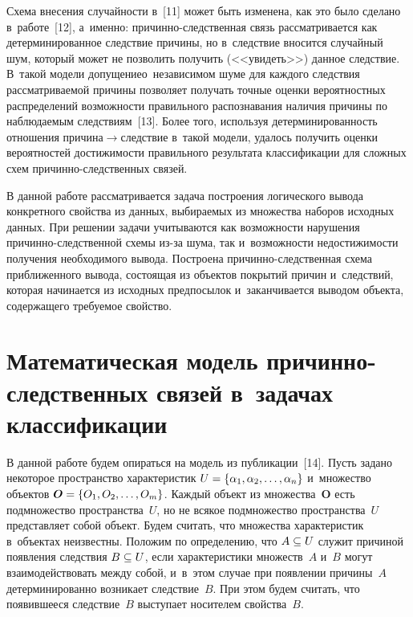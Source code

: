 \begin{multicols}{2}
  
  Схема внесения случайности в~[11] может быть изменена, как это было 
сделано в~работе~[12], а~именно: при\-чин\-но-след\-ст\-вен\-ная связь 
рас\-смат\-ри\-ва\-ет\-ся как детерминированное следствие причины, но в~следствие 
вносится случайный шум, который может не позволить получить (<<увидеть>>) 
данное следствие. В~такой модели допущение\linebreak о~независимом шуме для каждого 
следствия рас\-смат\-ри\-ва\-емой причины позволяет получать точные оценки 
вероятностных распределений воз\-мож\-ности правильного распознавания наличия 
\mbox{причины} по на\-блюда\-емым следствиям~[13]. Более того, используя 
детерминированность отношения при\-чи\-на\;$\to$\;след\-ст\-вие в~такой модели, 
удалось получить оценки вероятностей до\-сти\-жи\-мости правильного результата 
классификации для сложных схем при\-чин\-но-след\-ст\-вен\-ных связей. 
  
  В данной работе рассматривается задача построения логического вывода 
конкретного свойства из данных, выбираемых из множества наборов исходных 
данных. При решении задачи учитываются как возможности нарушения  
при\-чин\-но-след\-ст\-вен\-ной схемы из-за шума, так и~возможности 
недостижимости получения необходимого вывода. По\-стро\-ена при\-чин\-но-след\-ст\-вен\-ная 
схема приближенного вывода, состоящая из объектов покрытий 
причин и~следствий, которая начинается из исходных предпосылок 
и~заканчивается выводом объекта, содержащего требуемое свойство.
  
  \section{Математическая модель причинно-следственных связей 
в~задачах классификации}
  
  В данной работе будем опираться на модель из публикации~[14]. Пусть задано 
некоторое пространство характеристик $U\hm= \{\alpha_1,\alpha_2, \ldots, 
\alpha_n\}$ и~множество объектов $\bm{O}\hm= \{O_1, O_2, \dots, O_m\}$. 
Каждый объект из множества~$\bm{O}$ есть подмножество пространства~$U$, 
но не всякое подмножество пространства~$U$ представляет собой объект. Будем 
считать, что множества характеристик в~объектах неизвестны. Положим по 
определению, что $A\hm\subseteq U$ служит причиной появления следствия 
$B\hm\subseteq U$, если характеристики множеств~$A$ и~$B$ могут 
взаимодействовать между собой, и~в~этом случае при появлении причины~$A$ 
детерминированно возникает следствие~$B$. При этом будем считать, что 
появившееся следствие~$B$ выступает носителем свойства~$B$.
{

}
\end{multicols}
